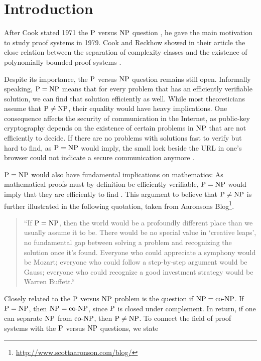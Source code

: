 \chapter{Introduction}
  After Cook stated 1971 the \(\P\) versus \(\NP\) question \cite{C71}, he gave the main motivation to study proof systems in 1979. Cook and Reckhow showed in their article the close relation between the separation of complexity classes and the existence of polynomially bounded proof systems \cite{CR79}.

  Despite its importance, the \(\P\) versus \(\NP\) question remains still open. Informally speaking, \(\P = \NP\) means that for every problem that has an efficiently verifiable solution, we can find that solution efficiently as well. While most theoreticians assume that \(\P \neq \NP\), their equality would have heavy implications. One consequence affects the security of communication in the Internet, as public-key cryptography depends on the existence of certain problems in \(\NP\) that are not efficiently to decide. If there are no problems with solutions fast to verify but hard to find, as \(\P = \NP\) would imply, the small lock beside the URL in one's browser could not indicate a secure communication anymore \cite{F09}.

  \(\P = \NP\) would also have fundamental implications on mathematics: As mathematical proofs must by definition be efficiently verifiable, \(\P = \NP\) would imply that they are efficiently to find \cite{CR79}. This argument to believe that \(\P \neq \NP\) is further illustrated in the following quotation, taken from Aaronsons Blog\footnote{\url{http://www.scottaaronson.com/blog/}}.

  \begin{quotation}
    ``If \(\P=\NP\), then the world would be a profoundly different place than we usually assume it to be. There would be no special value in `creative leaps', no fundamental gap between solving a problem and recognizing the solution once it's found. Everyone who could appreciate a symphony would be Mozart; everyone who could follow a step-by-step argument would be Gauss; everyone who could recognize a good investment strategy would be Warren Buffett.``
  \end{quotation}

  Closely related to the \(\P\) versus \(\NP\) problem is the question if \(\NP = \coNP\). If \(\P = \NP\), then \(\NP = \coNP\), since \(\P\) is closed under complement. In return, if one can separate \(\NP\) from \(\coNP\), then \(\P \neq \NP\). To connect the field of proof systems with the \(\P\) versus \(\NP\) questions, we state


